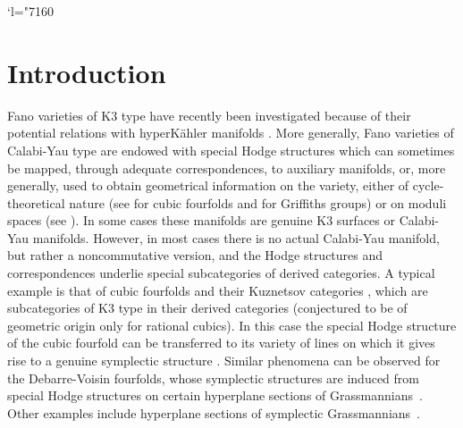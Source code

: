 \documentclass[11pt]{article}
\newcommand{\Changel}{\mathcode`l="7160}
\theoremstyle{plain}
\theoremstyle{definition}
\begin{document}
\Changel

\section{Introduction}

Fano varieties of K3 type have recently been investigated because of their potential
relations with hyperKähler manifolds \cite{debarre-voisin,fm,imcy}. More generally, Fano varieties of Calabi-Yau type
are endowed with special Hodge structures which can sometimes be mapped, through adequate correspondences,
to auxiliary manifolds, or, more generally, used to obtain geometrical information on the variety,
either of cycle-theoretical nature (see \cite{hassett:special-cubics} for cubic fourfolds and \cite{fik-griffiths} for
Griffiths groups) or on moduli spaces (see \cite{debarre-voisin}).
In some cases these manifolds are genuine K3 surfaces or Calabi-Yau
manifolds. However, in most cases there is no actual Calabi-Yau manifold, but rather a
noncommutative version,
and the Hodge structures and correspondences underlie special subcategories of derived categories. A typical example
is that of cubic fourfolds and their Kuznetsov categories \cite{kuz:4fold,at12}, which are subcategories of
K3 type in their derived categories (conjectured to be of geometric origin only for
rational cubics). In this case the special Hodge structure of the cubic fourfold can be
transferred to its variety of lines on which it gives rise to a genuine symplectic structure \cite{beauville-donagi}.
Similar phenomena can be observed for the Debarre-Voisin fourfolds, whose symplectic
structures are induced from special Hodge structures on certain hyperplane sections
of Grassmannians~\cite{debarre-voisin}. Other examples include hyperplane sections
of symplectic Grassmannians~\cite{fm}.
\end{document}
